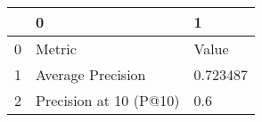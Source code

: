 \begin{tabular}{lll}
\toprule
{} &                       0 &         1 \\
\midrule
0 &                  Metric &     Value \\
1 &       Average Precision &  0.723487 \\
2 &  Precision at 10 (P@10) &       0.6 \\
\bottomrule
\end{tabular}
